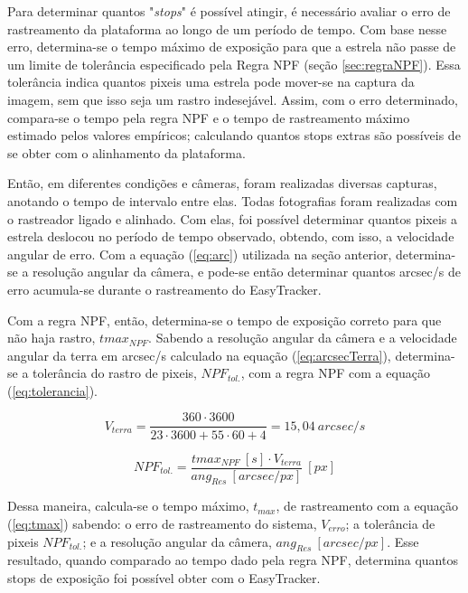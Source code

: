Para determinar quantos "\textit{stops}" é possível atingir, é necessário avaliar o erro de rastreamento da plataforma ao longo de um período de tempo. Com base nesse erro, determina-se o tempo máximo de exposição para que a estrela não passe de um limite de tolerância especificado pela Regra NPF (seção \ref{sec:regraNPF}). Essa tolerância indica quantos pixeis uma estrela pode mover-se na captura da imagem, sem que isso seja um rastro indesejável. Assim, com o erro determinado, compara-se o tempo pela regra NPF e o tempo de rastreamento máximo estimado pelos valores empíricos; calculando quantos stops extras são possíveis de se obter com o alinhamento da plataforma.

Então, em diferentes condições e câmeras, foram realizadas diversas capturas, anotando o tempo de intervalo entre elas. Todas fotografias foram realizadas com o rastreador ligado e alinhado. Com elas, foi possível determinar quantos pixeis a estrela deslocou no período de tempo observado, obtendo, com isso, a velocidade angular de erro. Com a equação (\ref{eq:arc}) utilizada na seção anterior, determina-se a resolução angular da câmera, e pode-se então determinar quantos arcsec/s de erro acumula-se durante o rastreamento do EasyTracker.

Com a regra NPF, então, determina-se o tempo de exposição correto para que não haja rastro, $ tmax_{NPF} $. Sabendo a resolução angular da câmera e a velocidade angular da terra em arcsec/s calculado na equação (\ref{eq:arcsecTerra}), determina-se a tolerância do rastro de pixeis, $ NPF_{tol.} $,  com a regra NPF com a equação (\ref{eq:tolerancia}). 

\begin{equation}
	V_{terra} = \dfrac{360 \cdot 3600}{23\cdot3600+55\cdot60 + 4} = 15,04~arcsec/s
	\label{eq:arcsecTerra}
\end{equation}

\begin{equation}
	NPF_{tol.} = \dfrac{tmax_{NPF} ~\left[s\right]\cdot V_{terra}}{ang_{Res}~\left[arcsec/px\right]}~\left[px\right]
	\label{eq:tolerancia}
\end{equation}

Dessa maneira, calcula-se o tempo máximo, $ t_{max} $, de rastreamento com a equação (\ref{eq:tmax}) sabendo: o erro de rastreamento do sistema, $ V_{erro} $; a tolerância de pixeis $ NPF_{tol.} $; e a resolução angular da câmera, $ ang_{Res}~\left[arcsec/px\right] $. Esse resultado, quando comparado ao tempo dado pela regra NPF, determina quantos stops de exposição foi possível obter com o EasyTracker. 

